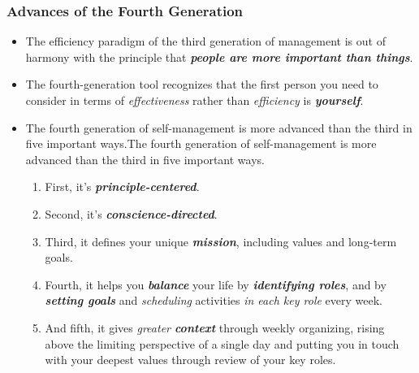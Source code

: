 \documentclass[11pt]{article}
\begin{document}
\subsubsection{Advances of the Fourth Generation}
\begin{itemize}
\item The efficiency paradigm of the third generation of management is out of harmony with the principle that \emph{\textbf{people are more important than things}}.
\item The fourth-generation tool recognizes that the first person you need to consider in terms of \emph{effectiveness} rather than \emph{efficiency} is \emph{\textbf{yourself}}.
\item The fourth generation of self-management is more advanced than the third in five important ways.The fourth generation of self-management is more advanced than the third in five important ways.
\begin{enumerate}
\item First, it's \emph{\textbf{principle-centered}}.
\item Second, it's \emph{\textbf{conscience-directed}}.
\item Third, it defines your unique \emph{\textbf{mission}}, including values and long-term goals. 
\item Fourth, it helps you \emph{\textbf{balance}} your life by \emph{\textbf{identifying roles}}, and by \emph{\textbf{setting goals}} and \emph{scheduling}
activities \emph{in each key role} every week.
\item And fifth, it gives \emph{greater \textbf{context}} through weekly organizing, rising above the limiting perspective of a single day and putting you in touch with your deepest values through review of your key roles.
\end{enumerate}
\end{itemize}
\end{document}
